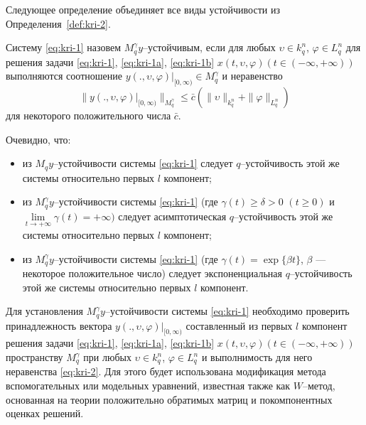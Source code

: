 Следующее определение объединяет все виды устойчивости из
Определения~\ref{def:kri-2}.

\begin{definition}\label{def:kri-3}
    Систему \eqref{eq:kri-1} назовем  $M_q^\gamma y
    $--устойчивым, если для любых $\upsilon \in k^n_q$, $\varphi \in
    L^n_q$ для решения задачи \eqref{eq:kri-1}, \eqref{eq:kri-1a}, \eqref{eq:kri-1b}   $x(t,\upsilon,
    \varphi)(t \in (-\infty, +\infty))$ выполняются  соотношение $y(.,
    \upsilon, \varphi)|_{[0,\infty)} \in M_q^\gamma$ и неравенство
    \begin{equation}
        \label{eq:kri-2}
        \|y(., \upsilon, \varphi)|_{[0,\infty)}\|_{M_q^\gamma} \le \bar c\left(\|\upsilon\|_{k^n_q} +
        \|\varphi \|_{L^n_q}\right)
    \end{equation}
    для некоторого положительного числа $\bar c$.
\end{definition}

Очевидно, что:
\begin{itemize}
    \item из  $M_qy$--устойчивости системы \eqref{eq:kri-1}
    следует $q$--устойчивость этой же системы относительно  первых $l$
    компонент;
    
    \item из $M_q^\gamma y$--устойчивости системы \eqref{eq:kri-1}
    (где $\gamma (t) \ge \delta > 0$ $(t \ge 0)$ и $\lim \limits _{t
    \rightarrow +\infty } \gamma (t) = +\infty )$ следует
    асимптотическая $q$--устойчивость этой же системы относительно
    первых $l$ компонент;
    
    \item из $M_q^\gamma y$--устойчивости системы \eqref{eq:kri-1}
    (где $\gamma (t) = \exp \{\beta t\}$, $\beta$ --- некоторое
    положительное число) следует экспоненциальная $q$--устойчивость этой
    же системы относительно первых $l$ компонент.
\end{itemize}


Для установления $M_q^\gamma y$--устойчивости системы \eqref{eq:kri-1} необходимо
проверить принадлежность вектора $y(., \upsilon,\varphi
)|_{[0,\infty)}$ составленный из первых $l$ компонент решения задачи
\eqref{eq:kri-1}, \eqref{eq:kri-1a}, \eqref{eq:kri-1b} $x(t,\upsilon, \varphi)(t \in (-\infty, +\infty))$
пространству $M_q^\gamma$ при любых $\upsilon \in k^n_q$, $\varphi
\in L^n_q$ и выполнимость для него неравенства \eqref{eq:kri-2}. Для этого будет
использована модификация метода вспомогательных  или модельных
уравнений, известная также как $W$--метод, основанная на теории
положительно обратимых матриц и покомпонентных оценках решений.

